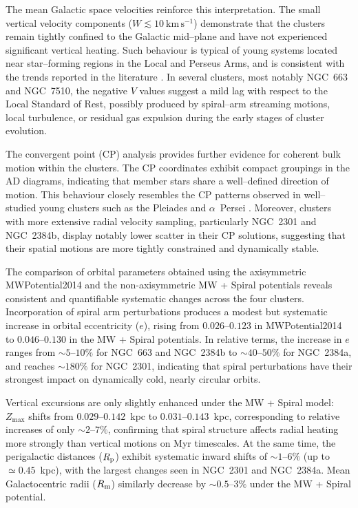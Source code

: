 \documentclass[referee]{raa}            %
\begin{document}
The mean Galactic space velocities reinforce this interpretation. The small vertical velocity components ($W \lesssim 10~\mathrm{km\,s^{-1}}$) demonstrate that the clusters remain tightly confined to the Galactic mid–plane and have not experienced significant vertical heating. Such behaviour is typical of young systems located near star–forming regions in the Local and Perseus Arms, and is consistent with the trends reported in the literature \citep{KounkelCovey2019, Zari2019}. In several clusters, most notably NGC~663 and NGC~7510, the negative $V$ values suggest a mild lag with respect to the Local Standard of Rest, possibly produced by spiral–arm streaming motions, local turbulence, or residual gas expulsion during the early stages of cluster evolution.

The convergent point (CP) analysis provides further evidence for coherent bulk motion within the clusters. The CP coordinates exhibit compact groupings in the AD diagrams, indicating that member stars share a well–defined direction of motion. This behaviour closely resembles the CP patterns observed in well–studied young clusters such as the Pleiades and $\alpha$~Persei \citep{2012A&A...538A..23G, Elsanhoury2018}. Moreover, clusters with more extensive radial velocity sampling, particularly NGC~2301 and NGC~2384b, display notably lower scatter in their CP solutions, suggesting that their spatial motions are more tightly constrained and dynamically stable.

The comparison of orbital parameters obtained using the axisymmetric {\sc MWPotential2014} and the non-axisymmetric MW + Spiral potentials reveals consistent and quantifiable systematic changes across the four clusters. Incorporation of spiral arm perturbations produces a modest but systematic increase in orbital eccentricity ($e$), rising from $0.026$--$0.123$ in {\sc MWPotential2014} to $0.046$--$0.130$ in the MW + Spiral potentials. In relative terms, the increase in $e$ ranges from $\sim5$--$10\%$ for NGC~663 and NGC~2384b to $\sim40$--$50\%$ for NGC~2384a, and reaches $\sim180\%$ for NGC~2301, indicating that spiral perturbations have their strongest impact on dynamically cold, nearly circular orbits.

Vertical excursions are only slightly enhanced under the MW + Spiral model: $Z_{\max}$ shifts from $0.029$--$0.142$~kpc to $0.031$--$0.143$~kpc, corresponding to relative increases of only $\sim2$--$7\%$, confirming that spiral structure affects radial heating more strongly than vertical motions on Myr timescales. At the same time, the perigalactic distances ($R_{\rm p}$) exhibit systematic inward shifts of $\sim1$--$6\%$ (up to $\simeq 0.45$~kpc), with the largest changes seen in NGC~2301 and NGC~2384a. Mean Galactocentric radii ($R_{\rm m}$) similarly decrease by $\sim0.5$--$3\%$ under the MW + Spiral potential.
\end{document}
